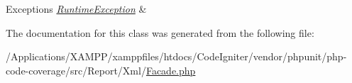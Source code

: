 \begin{DoxyExceptions}{Exceptions}
{\em \mbox{\hyperlink{class_sebastian_bergmann_1_1_code_coverage_1_1_runtime_exception}{Runtime\+Exception}}} & \\
\hline
\end{DoxyExceptions}


The documentation for this class was generated from the following file\+:\begin{DoxyCompactItemize}
\item 
/\+Applications/\+X\+A\+M\+P\+P/xamppfiles/htdocs/\+Code\+Igniter/vendor/phpunit/php-\/code-\/coverage/src/\+Report/\+Xml/\mbox{\hyperlink{php-code-coverage_2src_2_report_2_xml_2_facade_8php}{Facade.\+php}}\end{DoxyCompactItemize}
